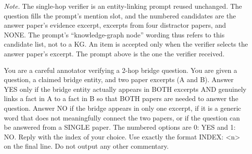 \documentclass[11pt]{article}
\begin{document}
\noindent\textit{Note.} The single-hop verifier is an entity-linking prompt reused unchanged. The question fills the prompt's mention slot, and the numbered candidates are the answer paper's evidence excerpt, excerpts from four distractor papers, and NONE. The prompt's ``knowledge-graph node'' wording thus refers to this candidate list, not to a KG. An item is accepted only when the verifier selects the answer paper's excerpt. The prompt above is the one the verifier received.

\begin{tcolorbox}[breakable, colback=gray!3, colframe=gray!55, colbacktitle=black!75, coltitle=white, boxrule=0.6pt, title=\textbf{Released-benchmark two-hop bridge verifier system prompt}, fonttitle=\small\bfseries]
\footnotesize\raggedright{}
You are a careful annotator verifying a 2-hop bridge question. You are given a question, a claimed bridge entity, and two paper excerpts (A and B). Answer YES only if the bridge entity actually appears in BOTH excerpts AND genuinely links a fact in A to a fact in B so that BOTH papers are needed to answer the question. Answer NO if the bridge appears in only one excerpt, if it is a generic word that does not meaningfully connect the two papers, or if the question can be answered from a SINGLE paper. The numbered options are 0: YES and 1: NO. Reply with the index of your choice. Use exactly the format INDEX: <n> on the final line. Do not output any other commentary.
\end{tcolorbox}
\end{document}
